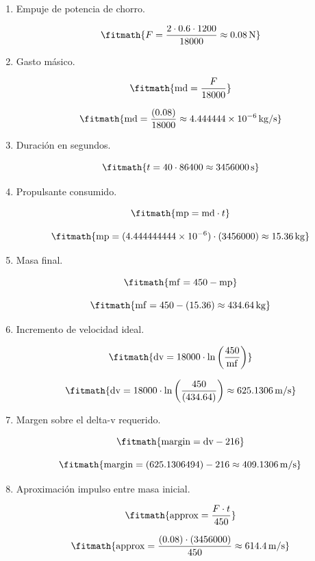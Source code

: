\begin{enumerate}

\item Empuje de potencia de chorro.

\[\fitmath{F=\frac{2\cdot 0.6\cdot 1200}{18000}\approx 0.08\,\mathrm{N}}\]

\item Gasto másico.

\[\fitmath{\mathrm{md}=\frac{F}{18000}}\]

\[\fitmath{\mathrm{md}=\frac{(0.08)}{18000}\approx 4.444444\times10^{-6}\,\mathrm{kg/s}}\]

\item Duración en segundos.

\[\fitmath{t=40\cdot 86400\approx 3456000\,\mathrm{s}}\]

\item Propulsante consumido.

\[\fitmath{\mathrm{mp}=\mathrm{md}\cdot t}\]

\[\fitmath{\mathrm{mp}=(4.444444444\times10^{-6})\cdot (3456000)\approx 15.36\,\mathrm{kg}}\]

\item Masa final.

\[\fitmath{\mathrm{mf}=450-\mathrm{mp}}\]

\[\fitmath{\mathrm{mf}=450-(15.36)\approx 434.64\,\mathrm{kg}}\]

\item Incremento de velocidad ideal.

\[\fitmath{\mathrm{dv}=18000\cdot \ln\left(\frac{450}{\mathrm{mf}}\right)}\]

\[\fitmath{\mathrm{dv}=18000\cdot \ln\left(\frac{450}{(434.64)}\right)\approx 625.1306\,\mathrm{m/s}}\]

\item Margen sobre el delta-v requerido.

\[\fitmath{\mathrm{margin}=\mathrm{dv}-216}\]

\[\fitmath{\mathrm{margin}=(625.1306494)-216\approx 409.1306\,\mathrm{m/s}}\]

\item Aproximación impulso entre masa inicial.

\[\fitmath{\mathrm{approx}=\frac{F\cdot t}{450}}\]

\[\fitmath{\mathrm{approx}=\frac{(0.08)\cdot (3456000)}{450}\approx 614.4\,\mathrm{m/s}}\]

\end{enumerate}

